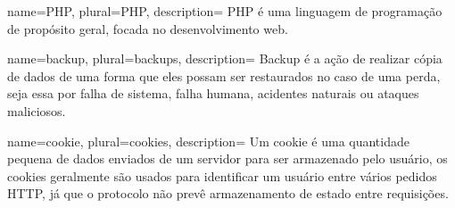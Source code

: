 {
  name=PHP,
  plural=PHP,
  description={
    PHP é uma linguagem de programação de propósito geral, focada no desenvolvimento web.
  }
}

{
  name=backup,
  plural=backups,
  description={
   Backup é a ação de realizar cópia de dados de uma forma que eles possam ser restaurados no caso de uma perda, seja essa por falha de sistema, falha humana, acidentes naturais ou ataques maliciosos.
  }
}

{
  name=cookie,
  plural=cookies,
  description={
   Um cookie é uma quantidade pequena de dados enviados de um servidor para ser armazenado pelo usuário, os cookies geralmente são usados para identificar um usuário entre vários pedidos \gls{HTTP}, já que o protocolo não prevê armazenamento de estado entre requisições.
  }
}
